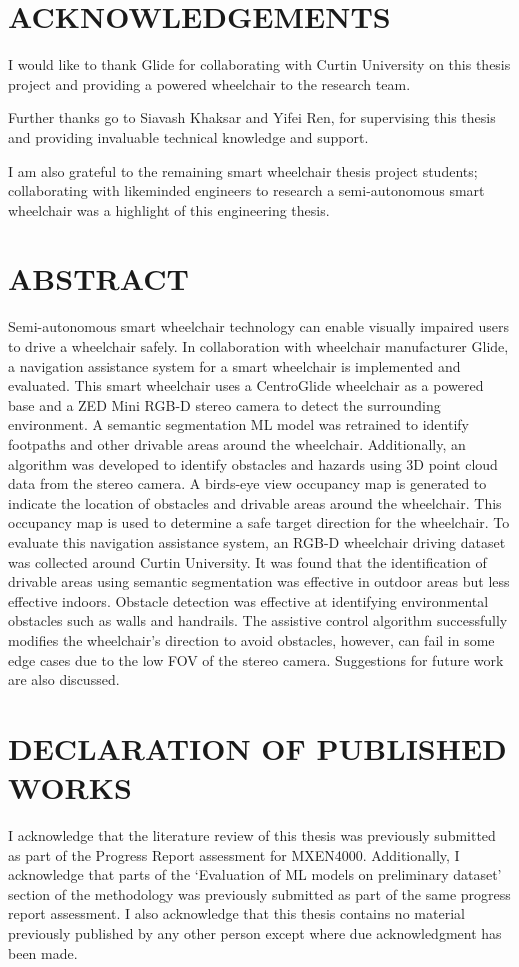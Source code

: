 \section*{ACKNOWLEDGEMENTS}
I would like to thank Glide for collaborating with Curtin University on this thesis project
and providing a powered wheelchair to the research team.

Further thanks go to Siavash Khaksar and Yifei Ren,
for supervising this thesis and providing invaluable technical knowledge and support.

I am also grateful to the remaining smart wheelchair thesis project students;
collaborating with likeminded engineers to research a semi-autonomous smart
wheelchair was a highlight of this engineering thesis.

\cleardoublepage

\section*{ABSTRACT}
Semi-autonomous smart wheelchair technology can enable visually impaired users to drive a wheelchair
safely. In collaboration with wheelchair manufacturer Glide, a navigation assistance system for a
smart wheelchair is implemented and evaluated. This smart wheelchair uses a CentroGlide wheelchair
as a powered base and a ZED Mini RGB-D stereo camera to detect the surrounding environment.
A semantic segmentation ML model was retrained to identify footpaths and other drivable areas around the wheelchair.
Additionally, an algorithm was developed to identify obstacles and hazards using 3D point cloud data from the stereo camera.
A birds-eye view occupancy map is generated to indicate the location of obstacles and drivable areas
around the wheelchair. This occupancy map is used to determine a safe target direction for the wheelchair.
To evaluate this navigation assistance system, an RGB-D wheelchair driving dataset was collected
around Curtin University. It was found that the identification of drivable areas using semantic segmentation was effective in outdoor
areas but less effective indoors. Obstacle detection was effective at identifying environmental obstacles such as
walls and handrails. The assistive control algorithm successfully modifies the wheelchair's direction to avoid obstacles,
however, can fail in some edge cases due to the low FOV of the stereo camera. Suggestions for future work are also discussed.
\cleardoublepage

\section*{DECLARATION OF PUBLISHED WORKS}
I acknowledge that the literature review of this thesis was previously submitted as part of the Progress Report assessment for MXEN4000.
Additionally, I acknowledge that parts of the `Evaluation of ML models on preliminary dataset'
section of the methodology was previously submitted as part of the same progress report assessment.
I also acknowledge that this thesis contains no material previously
published by any other person except where due acknowledgment has been made.
